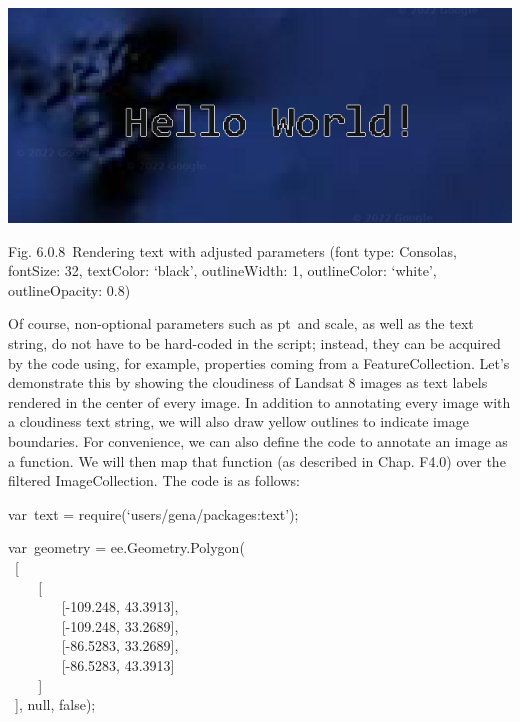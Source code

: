 \documentclass[
  letterpaper,
  DIV=11,
  numbers=noendperiod]{scrreprt}
\begin{document}
\includegraphics{./F6/image33.png}

Fig. 6.0.8~Rendering text with adjusted parameters (font type: Consolas,
fontSize: 32, textColor: `black', outlineWidth: 1, outlineColor:
`white', outlineOpacity: 0.8)

Of course, non-optional parameters such as pt~and scale, as well as the
text string, do not have to be hard-coded in the script; instead, they
can be acquired by the code using, for example, properties coming from a
FeatureCollection. Let's demonstrate this by showing the cloudiness of
Landsat 8 images as text labels rendered in the center of every image.
In addition to annotating every image with a cloudiness text string, we
will also draw yellow outlines to indicate image boundaries. For
convenience, we can also define the code to annotate an image as a
function. We will then map that function (as described in Chap. F4.0)
over the filtered ImageCollection. The code is as follows:

var~text = require(`users/gena/packages:text');

var~geometry = ee.Geometry.Polygon(\\
\hspace*{0.333em} ~{[}\\
\hspace*{0.333em} ~ ~ ~{[}\\
\hspace*{0.333em} ~ ~ ~ ~ ~{[}-109.248, 43.3913{]},\\
\hspace*{0.333em} ~ ~ ~ ~ ~{[}-109.248, 33.2689{]},\\
\hspace*{0.333em} ~ ~ ~ ~ ~{[}-86.5283, 33.2689{]},\\
\hspace*{0.333em} ~ ~ ~ ~ ~{[}-86.5283, 43.3913{]}\\
\hspace*{0.333em} ~ ~ ~{]}\\
\hspace*{0.333em} ~{]}, null, false);
\end{document}

